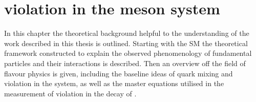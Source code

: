 
\chapter[
  head={\CP violation in the \Bd meson system},
  tocentry={\CPbfsf violation in the \Bdbfsf meson system}
]
{\CPbfsf violation in the \Bdbfsf meson system}
\label{ch:cpv_theory}

In this chapter the theoretical background helpful to the understanding of the
work described in this thesis is outlined. Starting with the \acl*{SM} the
theoretical framework constructed to explain the observed phenomenology of
fundamental particles and their interactions is described. Then an overview off
the field of flavour physics is given, including the baseline ideas of quark
mixing and \CP violation in the \Bmeson system, as well as the master equations
utilised in the measurement of \CP violation in the decay of \BdToJpsiKS.






